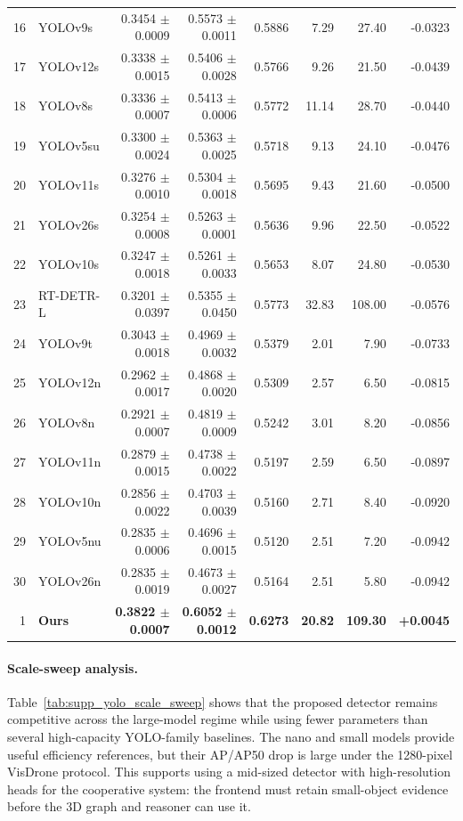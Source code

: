 \begin{table}[!htbp]
{\begin{tabular}{rlrrrrrr}
16 & YOLOv9s & 0.3454 $\pm$ 0.0009 & 0.5573 $\pm$ 0.0011 & 0.5886 & 7.29 & 27.40 & -0.0323 \\
17 & YOLOv12s & 0.3338 $\pm$ 0.0015 & 0.5406 $\pm$ 0.0028 & 0.5766 & 9.26 & 21.50 & -0.0439 \\
18 & YOLOv8s & 0.3336 $\pm$ 0.0007 & 0.5413 $\pm$ 0.0006 & 0.5772 & 11.14 & 28.70 & -0.0440 \\
19 & YOLOv5su & 0.3300 $\pm$ 0.0024 & 0.5363 $\pm$ 0.0025 & 0.5718 & 9.13 & 24.10 & -0.0476 \\
20 & YOLOv11s & 0.3276 $\pm$ 0.0010 & 0.5304 $\pm$ 0.0018 & 0.5695 & 9.43 & 21.60 & -0.0500 \\
21 & YOLOv26s & 0.3254 $\pm$ 0.0008 & 0.5263 $\pm$ 0.0001 & 0.5636 & 9.96 & 22.50 & -0.0522 \\
22 & YOLOv10s & 0.3247 $\pm$ 0.0018 & 0.5261 $\pm$ 0.0033 & 0.5653 & 8.07 & 24.80 & -0.0530 \\
23 & RT-DETR-L & 0.3201 $\pm$ 0.0397 & 0.5355 $\pm$ 0.0450 & 0.5773 & 32.83 & 108.00 & -0.0576 \\
24 & YOLOv9t & 0.3043 $\pm$ 0.0018 & 0.4969 $\pm$ 0.0032 & 0.5379 & 2.01 & 7.90 & -0.0733 \\
25 & YOLOv12n & 0.2962 $\pm$ 0.0017 & 0.4868 $\pm$ 0.0020 & 0.5309 & 2.57 & 6.50 & -0.0815 \\
26 & YOLOv8n & 0.2921 $\pm$ 0.0007 & 0.4819 $\pm$ 0.0009 & 0.5242 & 3.01 & 8.20 & -0.0856 \\
27 & YOLOv11n & 0.2879 $\pm$ 0.0015 & 0.4738 $\pm$ 0.0022 & 0.5197 & 2.59 & 6.50 & -0.0897 \\
28 & YOLOv10n & 0.2856 $\pm$ 0.0022 & 0.4703 $\pm$ 0.0039 & 0.5160 & 2.71 & 8.40 & -0.0920 \\
29 & YOLOv5nu & 0.2835 $\pm$ 0.0006 & 0.4696 $\pm$ 0.0015 & 0.5120 & 2.51 & 7.20 & -0.0942 \\
30 & YOLOv26n & 0.2835 $\pm$ 0.0019 & 0.4673 $\pm$ 0.0027 & 0.5164 & 2.51 & 5.80 & -0.0942 \\
\midrule
1 & \textbf{Ours} & \textbf{0.3822 $\pm$ 0.0007} & \textbf{0.6052 $\pm$ 0.0012} & \textbf{0.6273} & \textbf{20.82} & \textbf{109.30} & \textbf{+0.0045} \\
\bottomrule
\end{tabular}
}
\end{table}

\paragraph{Scale-sweep analysis.}
Table~\ref{tab:supp_yolo_scale_sweep} shows that the proposed detector remains
competitive across the large-model regime while using fewer parameters than
several high-capacity YOLO-family baselines. The nano and small models provide
useful efficiency references, but their AP/AP50 drop is large under the
1280-pixel VisDrone protocol. This supports using a mid-sized detector with
high-resolution heads for the cooperative system: the frontend must retain
small-object evidence before the 3D graph and reasoner can use it.

